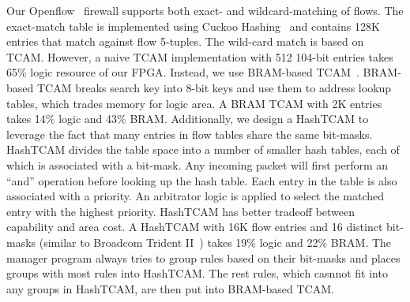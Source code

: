  Our Openflow~\cite{mckeown2008openflow} firewall supports 
both exact- and wildcard-matching of flows.
The exact-match table is implemented using Cuckoo Hashing~\cite{cuckoo} and contains 128K entries that match against flow 5-tuples. 
The wild-card match is based on TCAM.
However, a naive TCAM implementation with 512 104-bit entries takes 65\% logic resource of our FPGA.
Instead, we use BRAM-based TCAM~\cite{jiang2013scalable}. 
BRAM-based TCAM breaks search key into 8-bit keys and use them to address lookup tables, which trades memory for logic area. A BRAM TCAM with 2K entries takes 14\% logic and 43\% BRAM.
Additionally, we design a HashTCAM to leverage the fact that many entries in flow tables 
share the same bit-masks.
HashTCAM divides the table space into a number of smaller hash tables, each of which 
is associated with a bit-mask.
%
Any incoming packet will first perform an ``and'' operation before looking up the hash table.
Each entry in the table is also associated with a priority. 
An arbitrator logic is applied to  
select the matched entry with the highest priority. 
HashTCAM has better tradeoff between capability and area cost.
A HashTCAM with 16K flow entries and 16 distinct bit-masks (similar to Broadcom Trident II~\cite{broadcomethernet}) takes 19\% logic and 22\% BRAM.
%
The manager program always tries to group rules based on their bit-masks and places
groups with most rules into HashTCAM. 
%
The rest rules, which casnnot fit into any groups in HashTCAM, are then put into 
BRAM-based TCAM. 


